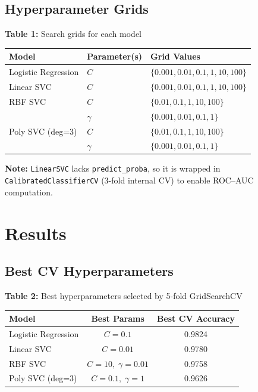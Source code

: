 \documentclass[10pt, letterpaper]{article}
\begin{document}
\subsection{Hyperparameter Grids}

\begin{center}
\small
\textbf{Table 1:} Search grids for each model\\[3pt]
\begin{tabular}{lll}
\toprule
Model & Parameter(s) & Grid Values \\
\midrule
Logistic Regression & $C$ & $\{0.001, 0.01, 0.1, 1, 10, 100\}$ \\
Linear SVC          & $C$ & $\{0.001, 0.01, 0.1, 1, 10, 100\}$ \\
RBF SVC             & $C$ & $\{0.01, 0.1, 1, 10, 100\}$ \\
                    & $\gamma$ & $\{0.001, 0.01, 0.1, 1\}$ \\
Poly SVC (deg=3)    & $C$ & $\{0.01, 0.1, 1, 10, 100\}$ \\
                    & $\gamma$ & $\{0.001, 0.01, 0.1, 1\}$ \\
\bottomrule
\end{tabular}
\end{center}

\textbf{Note:} \texttt{LinearSVC} lacks \texttt{predict\_proba}, so it is wrapped in \texttt{CalibratedClassifierCV} (3-fold internal CV) to enable ROC--AUC computation.

\section{Results}

\subsection{Best CV Hyperparameters}

\begin{center}
\small
\textbf{Table 2:} Best hyperparameters selected by 5-fold GridSearchCV\\[3pt]
\begin{tabular}{lcc}
\toprule
Model & Best Params & Best CV Accuracy \\
\midrule
Logistic Regression & $C = 0.1$                       & 0.9824 \\
Linear SVC          & $C = 0.01$                      & 0.9780 \\
RBF SVC             & $C = 10,\;\gamma = 0.01$        & 0.9758 \\
Poly SVC (deg=3)    & $C = 0.1,\;\gamma = 1$          & 0.9626 \\
\bottomrule
\end{tabular}
\end{center}
\end{document}
